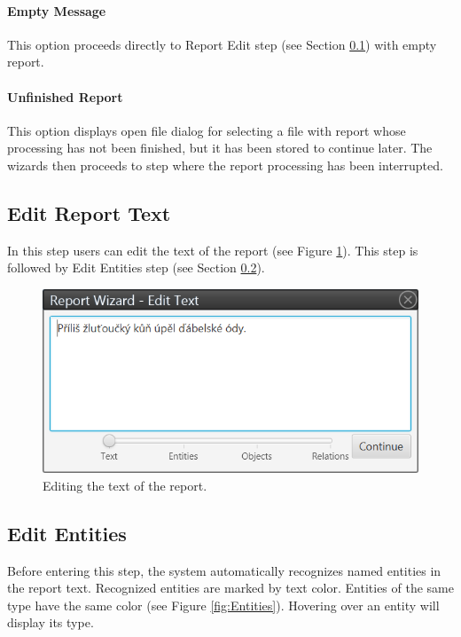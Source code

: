 \paragraph{Empty Message} This option proceeds directly to Report Edit step
(see Section \ref{sssec:ReportEdit}) with empty report.

\paragraph{Unfinished Report} This option displays open file dialog for
selecting a file with report whose processing has not been finished, but it
has been stored to continue later. The wizards then proceeds to step where
the report processing has been interrupted.

\subsection{Edit Report Text}
\label{sssec:ReportEdit}

In this step users can edit the text of the report (see Figure
\ref{fig:ReportEdit}). This step is followed by Edit Entities step (see Section
\ref{sssec:EditEntities}).

\begin{figure}[!htb]
        \centering
        \includegraphics[width=\textwidth]{Images/reportedit}
        \caption{Editing the text of the report.}
        \label{fig:ReportEdit}
\end{figure}

\subsection{Edit Entities}
\label{sssec:EditEntities}

Before entering this step, the system automatically recognizes named entities
in the report text. Recognized entities are marked by text color. Entities of
the same type have the same color (see Figure \ref{fig:Entities}). Hovering over
an entity will display its type.

